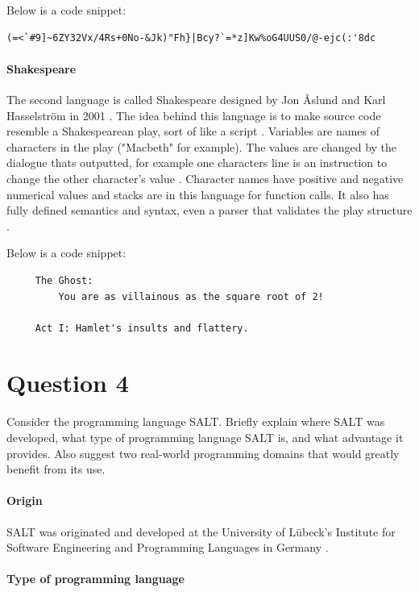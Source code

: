 \documentclass{article}
\begin{document}
Below is a code snippet:

\begin{verbatim}
(=<`#9]~6ZY32Vx/4Rs+0No-&Jk)"Fh}|Bcy?`=*z]Kw%oG4UUS0/@-ejc(:'8dc
\end{verbatim}

\paragraph{Shakespeare} 
The second language is called Shakespeare designed by Jon Åslund and Karl Hasselström in 2001 \cite{awesome-esolangs}. The idea behind this language is to make source code resemble a Shakespearean play, sort of like a script \cite{esolang-chef}. Variables are names of characters in the play ("Macbeth" for example). The values are changed by the dialogue thats outputted, for example one characters line is an instruction to change the other character's value \cite{esolang-wiki}. Character names have positive and negative numerical values and stacks are in this language for function calls. It also has fully defined semantics and syntax, even a parser that validates the play structure \cite{esolang-archive}.

Below is a code snippet:

\begin{verbatim}
     The Ghost:
         You are as villainous as the square root of 2!

     Act I: Hamlet's insults and flattery.
\end{verbatim}

\section{Question 4} Consider the programming language SALT. Briefly explain where SALT was developed, what type of programming language SALT is, and what advantage it provides. Also suggest two real-world programming domains that would greatly benefit from its use.

\paragraph{Origin} 

SALT was originated and developed at the University of Lübeck's Institute for Software Engineering and Programming Languages in Germany \cite{salt-lubeck}.

\paragraph{Type of programming language} 
\end{document}
